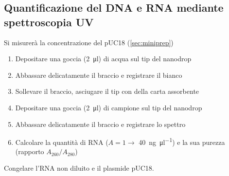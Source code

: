 \subsection{Quantificazione del DNA e RNA mediante spettroscopia UV}
\noindent Si misurerà la concentrazione del pUC18 (\autoref{sec:miniprep})
\begin{enumerate}
	\item Depositare una goccia (\qty{2}{\micro\litre}) di acqua sul tip del nanodrop
	\item Abbassare delicatamente il braccio e registrare il bianco
	\item Sollevare il braccio, asciugare il tip con della carta assorbente
	\item Depositare una goccia (\qty{2}{\micro\litre}) di campione sul tip del nanodrop
	\item Abbassare delicatamente il braccio e registrare lo spettro
	\item Calcolare la quantità di RNA (\(A=1\to\) \qty{40}{\ng\per\micro\litre}) e la sua purezza (rapporto \(A_{260}/A_{280}\))
\end{enumerate}
Congelare l'RNA non diluito e il plasmide pUC18.





\begingroup
\newpage
{}

\vspace{0.5cm}

\vspace{0.5cm}
\endgroup